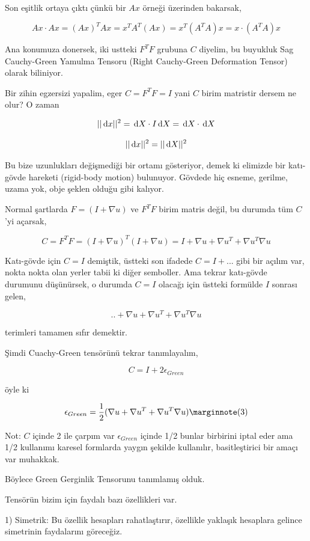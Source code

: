 \documentclass[12pt,fleqn]{article}\usepackage{../../common}
\begin{document}
Son eşitlik ortaya çıktı çünkü bir $Ax$ örneği üzerinden bakarsak,

$$
Ax \cdot Ax = (Ax)^T Ax = x^T A^T (Ax) = x^T (A^T A) x  = x \cdot (A^T A) x
$$

Ana konumuza donersek, iki ustteki $F^T F$ grubuna $C$ diyelim, bu buyukluk
Sag Cauchy-Green Yamulma Tensoru (Right Cauchy-Green Deformation Tensor)
olarak biliniyor.

Bir zihin egzersizi yapalim, eger $C = F^T F = I$ yani $C$ birim matristir
dersem ne olur? O zaman

$$
||\,\mathrm{d} x||^2  = \,\mathrm{d} X \cdot I \,\mathrm{d} X = \,\mathrm{d} X \cdot \,\mathrm{d} X
$$

$$
||\,\mathrm{d} x||^2 = ||\,\mathrm{d} X||^2
$$

Bu bize uzunlukları değişmediği bir ortamı gösteriyor, demek ki elimizde
bir katı-gövde hareketi (rigid-body motion) bulunuyor. Gövdede hiç esneme,
gerilme, uzama yok, obje şeklen olduğu gibi kalıyor.

Normal şartlarda $F = (I+\nabla u)$ ve $F^T F$ birim matris değil, bu durumda
tüm $C$'yi açarsak,

$$
C = F^T F = (I+\nabla u)^T (I+\nabla u) =
I + \nabla u + \nabla u^T + \nabla u^T \nabla u
$$

Katı-gövde için $C = I$ demiştik, üstteki son ifadede $C = I + ...$  gibi
bir açılım var, nokta nokta olan yerler tabii ki diğer semboller. Ama
tekrar katı-gövde durumunu düşünürsek, o durumda $C = I$ olacağı için
üstteki formülde $I$ sonrası gelen,

$$
.. + \nabla u + \nabla u^T + \nabla u^T \nabla u
$$

terimleri tamamen sıfır demektir.

Şimdi Cuachy-Green tensörünü tekrar tanımlayalım,

$$
C = I + 2 \epsilon_{Green} 
$$

öyle ki 

$$
\epsilon_{Green} = \frac{1}{2} (\nabla u + \nabla u^T + \nabla u^T \nabla u )
\mlabel{3}
$$

Not: $C$ içinde 2 ile çarpım var $\epsilon_{Green}$ içinde 1/2 bunlar birbirini
iptal eder ama 1/2 kullanımı karesel formlarda yaygın şekilde kullanılır,
basitleştirici bir amaçı var muhakkak. 

Böylece Green Gerginlik Tensorunu tanımlamış olduk.

Tensörün bizim için faydalı bazı özellikleri var.

1) Simetrik: Bu özellik hesapları rahatlaştırır, özellikle yaklaşık
hesaplara gelince simetrinin faydalarını göreceğiz. 
\end{document}
